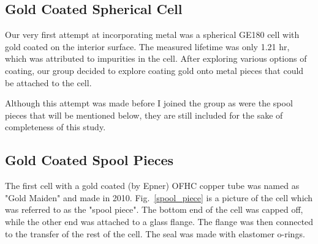 \subsection{Gold Coated Spherical Cell}

Our very first attempt at incorporating metal was a spherical GE180 cell with gold coated on the interior surface. The measured lifetime was only 1.21 hr, which was attributed to impurities in the cell. After exploring various options of coating, our group decided to explore coating gold onto metal pieces that could be attached to the cell.

Although this attempt was made before I joined the group as were the spool pieces that will be mentioned below, they are still included for the sake of completeness of this study. 

\subsection{Gold Coated Spool Pieces}

The first cell with a gold coated (by Epner) OFHC copper tube was named as "Gold Maiden" and made in 2010. Fig.~\ref{spool_piece} is a picture of the cell which was referred to as the "spool piece". The bottom end of the cell was capped off, while the other end was attached to a glass flange. The flange was then connected to the transfer of the rest of the cell. The seal was made with elastomer o-rings. 

